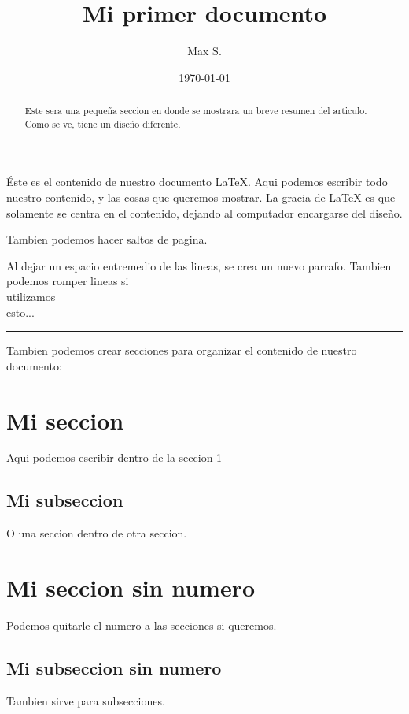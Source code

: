 \documentclass[12pt]{article}
\title{Mi primer documento}
\author{Max S.}
\date{\today}
\begin{document}
    \begin{titlepage}
        \maketitle
    \end{titlepage}

    \begin{abstract}
        Este sera una pequeña seccion en donde se mostrara un breve resumen del
        articulo. Como se ve, tiene un diseño diferente.
    \end{abstract}

    Éste es el contenido de nuestro documento \LaTeX{}. Aqui podemos escribir
    todo nuestro contenido, y las cosas que queremos mostrar. La gracia de \LaTeX{}
    es que solamente se centra en el contenido, dejando al computador encargarse
    del diseño.

    Tambien podemos hacer saltos de pagina.

    \newpage

    Al dejar un espacio entremedio de las lineas, se crea un nuevo parrafo.
    Tambien podemos romper lineas si \\ utilizamos \\ esto...

    \noindent\rule{5cm}{0.4pt}

    Tambien podemos crear secciones para organizar el contenido de nuestro
    documento:

    \section{Mi seccion}

        Aqui podemos escribir dentro de la seccion 1

        \subsection{Mi subseccion}

        O una seccion dentro de otra seccion.

    \section*{Mi seccion sin numero}

        Podemos quitarle el numero a las secciones si queremos.

        \subsection*{Mi subseccion sin numero}

        Tambien sirve para subsecciones.
\end{document}
